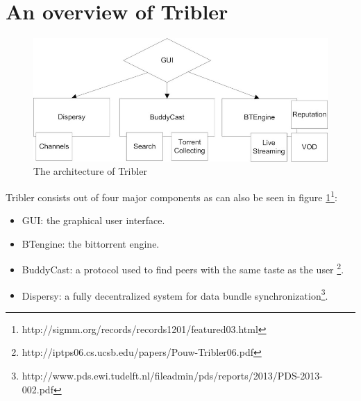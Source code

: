 \section{An overview of Tribler}

\begin{figure}[h]
	\centering
	\includegraphics[scale=0.4]{tribler/images/tribler_component_overview.jpg}
	\caption{The architecture of Tribler}
	\label{fig:tribler_components}
\end{figure}

Tribler consists out of four major components as can also be seen in figure \ref{fig:tribler_components}\footnote {http://sigmm.org/records/records1201/featured03.html}:
\begin{itemize}
	\item GUI: the graphical user interface.
	\item BTengine: the bittorrent engine.
	\item BuddyCast: a protocol used to find peers with the same taste as the user \footnote{http://iptps06.cs.ucsb.edu/papers/Pouw-Tribler06.pdf}.
	\item Dispersy: a fully decentralized system for data bundle synchronization\footnote{http://www.pds.ewi.tudelft.nl/fileadmin/pds/reports/2013/PDS-2013-002.pdf}.
\end{itemize}

